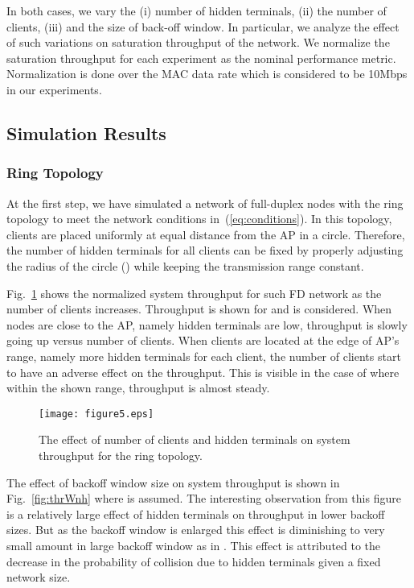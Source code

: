 \documentclass[10pt,journal,cspaper,compsoc]{IEEEtran}
\begin{document}
In both cases, we vary the (i) number of hidden terminals, (ii) the number of clients, (iii) and the size of back-off window. In particular, we analyze the effect of such variations on saturation throughput of the network. We normalize the saturation throughput for each experiment as the nominal performance metric. Normalization is done over the MAC data rate which is considered to be 10Mbps in our experiments.  



\subsection{Simulation Results}

\subsubsection{Ring Topology}
\label{sec:ring}
At the first step, we have simulated a network of full-duplex nodes with the ring topology to meet the network conditions in~(\ref{eq:conditions}). In this topology, clients are placed uniformly at equal distance from the AP in a circle. Therefore, the number of hidden terminals for all clients can be fixed by properly adjusting the radius of the circle () while keeping the transmission range constant. 

Fig.~\ref{fig:thrnnh1} shows the normalized system throughput for such FD network as the number of clients increases. Throughput is shown for  and  is considered. When nodes  are close to the AP, namely hidden terminals are low, throughput is slowly going up versus number of clients. When clients are located at the edge of AP's range, namely more hidden terminals for each client, the number of clients start to have an adverse effect on the throughput. This is visible in the case of  where within the shown range, throughput is almost steady. 


\begin{figure}[!t]
\centering
\texttt{[image: figure5.eps]}
\caption{The effect of number of clients and hidden terminals on system throughput for the ring topology.}
\label{fig:thrnnh1}
\end{figure} 








The effect of backoff window size on system throughput is shown in Fig.~\ref{fig:thrWnh} where  is assumed. The interesting observation from this figure is a relatively large effect of hidden terminals on throughput in lower backoff sizes. But as the backoff window is enlarged this effect is diminishing to very small amount in large backoff window as in . This effect is attributed to the decrease in the probability of collision due to hidden terminals given a fixed network size.  
\end{document}
